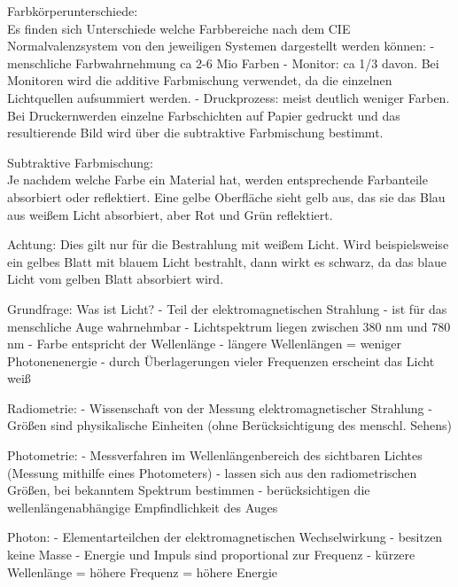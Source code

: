 \documentclass[10pt,landscape]{article}
\makeatletter
\renewcommand{\section}{\@startsection{section}{1}{0mm}%
                                {-1ex plus -.5ex minus -.2ex}%
                                {0.5ex plus .2ex}%
                                {\normalfont\large\bfseries}}
\renewcommand{\subsection}{\@startsection{subsection}{2}{0mm}%
                                {-1explus -.5ex minus -.2ex}%
                                {0.5ex plus .2ex}%
                                {\normalfont\normalsize\bfseries}}
\makeatother
\begin{document}
\begin{multicols}{3}
  Farbkörperunterschiede:\\
  Es finden sich Unterschiede welche Farbbereiche nach dem CIE Normalvalenzsystem von den jeweiligen Systemen dargestellt werden können:
  - menschliche Farbwahrnehmung ca 2-6 Mio Farben
  - Monitor: ca 1/3 davon. Bei Monitoren wird die additive Farbmischung verwendet, da die einzelnen Lichtquellen aufsummiert werden.
  - Druckprozess: meist deutlich weniger Farben. Bei Druckernwerden einzelne Farbschichten auf Papier gedruckt und das resultierende Bild wird über die subtraktive Farbmischung bestimmt.
  
  Subtraktive Farbmischung:\\
  Je nachdem welche Farbe ein Material hat, werden entsprechende Farbanteile absorbiert oder reflektiert. Eine gelbe Oberfläche sieht gelb aus, das sie das Blau aus weißem Licht absorbiert, aber Rot und Grün reflektiert.
  
  Achtung: Dies gilt nur für die Bestrahlung mit weißem Licht. Wird beispielsweise ein gelbes Blatt mit blauem Licht bestrahlt, dann wirkt es schwarz, da das blaue Licht vom gelben Blatt absorbiert wird.
  
  Grundfrage: Was ist Licht?
  - Teil der elektromagnetischen Strahlung
  - ist für das menschliche Auge wahrnehmbar
  - Lichtspektrum liegen zwischen 380 nm und 780 nm
  - Farbe entspricht der Wellenlänge
  - längere Wellenlängen = weniger Photonenenergie
  - durch Überlagerungen vieler Frequenzen erscheint das Licht weiß
  
  Radiometrie:
  - Wissenschaft von der Messung elektromagnetischer Strahlung
  - Größen sind physikalische Einheiten (ohne Berücksichtigung des menschl. Sehens)
  
  Photometrie:
  - Messverfahren im Wellenlängenbereich des sichtbaren Lichtes (Messung mithilfe eines Photometers)
  - lassen sich aus den radiometrischen Größen, bei bekanntem Spektrum bestimmen
  - berücksichtigen die wellenlängenabhängige Empfindlichkeit des Auges
  
  Photon:
  - Elementarteilchen der elektromagnetischen Wechselwirkung
  - besitzen keine Masse
  - Energie und Impuls sind proportional zur Frequenz
  - kürzere Wellenlänge = höhere Frequenz = höhere Energie
  

\end{multicols}
\end{document}
